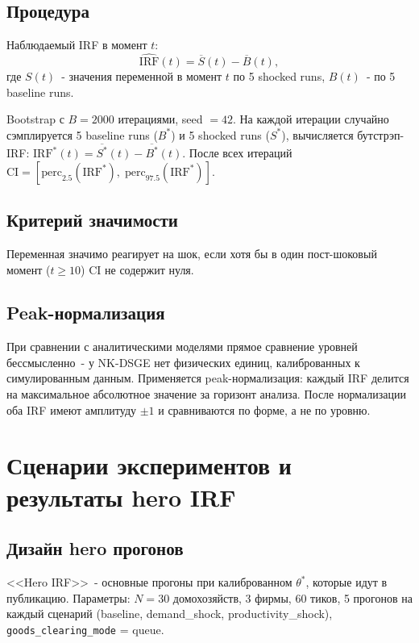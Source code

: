 \documentclass[12pt, a4paper]{article}
\begin{document}
\subsection{Процедура}

Наблюдаемый IRF в момент $t$:
\begin{equation}
\widehat{\text{IRF}}(t) = \overline{S}(t) - \overline{B}(t),
\end{equation}
где $S(t)$~- значения переменной в момент $t$ по 5 shocked runs, $B(t)$~- по 5 baseline runs.

Bootstrap с $B = 2000$ итерациями, seed $= 42$. На каждой итерации случайно сэмплируется 5 baseline runs ($B^*$) и 5 shocked runs ($S^*$), вычисляется бутстрэп-IRF: $\text{IRF}^*(t) = \overline{S^*}(t) - \overline{B^*}(t)$. После всех итераций $\text{CI} = [\text{perc}_{2.5}(\text{IRF}^*),\; \text{perc}_{97.5}(\text{IRF}^*)]$.

\subsection{Критерий значимости}

Переменная значимо реагирует на шок, если хотя бы в один пост-шоковый момент ($t \ge 10$) CI не содержит нуля.

\subsection{Peak-нормализация}

При сравнении с аналитическими моделями прямое сравнение уровней бессмысленно~- у NK-DSGE нет физических единиц, калиброванных к симулированным данным. Применяется peak-нормализация: каждый IRF делится на максимальное абсолютное значение за горизонт анализа. После нормализации оба IRF имеют амплитуду $\pm 1$ и сравниваются по форме, а не по уровню.

\section{Сценарии экспериментов и результаты hero IRF}

\subsection{Дизайн hero прогонов}

<<Hero IRF>>~- основные прогоны при калиброванном $\theta^*$, которые идут в публикацию. Параметры: $N = 30$ домохозяйств, 3 фирмы, 60 тиков, 5 прогонов на каждый сценарий (baseline, demand\_shock, productivity\_shock), \texttt{goods\_clearing\_mode} = queue.
\end{document}

